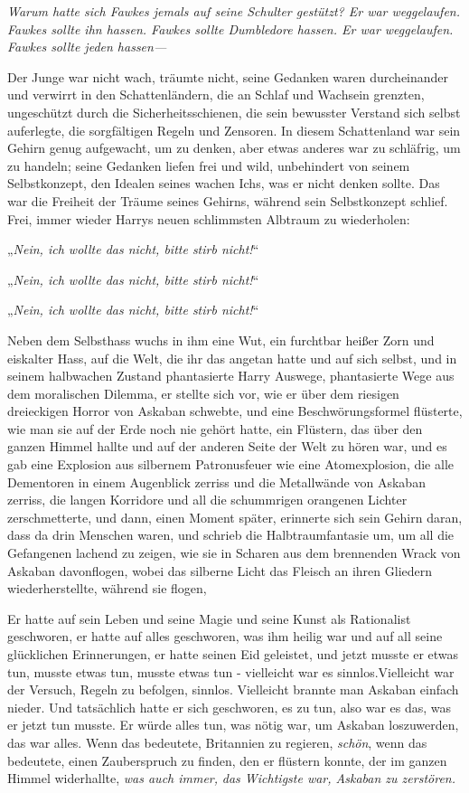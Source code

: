 {\emph{Warum hatte sich Fawkes jemals auf seine Schulter gestützt? Er war weggelaufen. Fawkes sollte ihn hassen. Fawkes sollte Dumbledore hassen. Er war weggelaufen. Fawkes sollte jeden hassen—}

Der Junge war nicht wach, träumte nicht, seine Gedanken waren durcheinander und verwirrt in den Schattenländern, die an Schlaf und Wachsein grenzten, ungeschützt durch die Sicherheitsschienen, die sein bewusster Verstand sich selbst auferlegte, die sorgfältigen Regeln und Zensoren. In diesem Schattenland war sein Gehirn genug aufgewacht, um zu denken, aber etwas anderes war zu schläfrig, um zu handeln; seine Gedanken liefen frei und wild, unbehindert von seinem Selbstkonzept, den Idealen seines wachen Ichs, was er nicht denken sollte. Das war die Freiheit der Träume seines Gehirns, während sein Selbstkonzept schlief. Frei, immer wieder Harrys neuen schlimmsten Albtraum zu wiederholen:

„\emph{Nein, ich wollte das nicht, bitte stirb nicht!}“

„\emph{Nein, ich wollte das nicht, bitte stirb nicht!}“

„\emph{Nein, ich wollte das nicht, bitte stirb nicht!}“

Neben dem Selbsthass wuchs in ihm eine Wut, ein furchtbar heißer Zorn und eiskalter Hass, auf die Welt, die ihr das angetan hatte und auf sich selbst, und in seinem halbwachen Zustand phantasierte Harry Auswege, phantasierte Wege aus dem moralischen Dilemma, er stellte sich vor, wie er über dem riesigen dreieckigen Horror von Askaban schwebte, und eine Beschwörungsformel flüsterte, wie man sie auf der Erde noch nie gehört hatte, ein Flüstern, das über den ganzen Himmel hallte und auf der anderen Seite der Welt zu hören war, und es gab eine Explosion aus silbernem Patronusfeuer wie eine Atomexplosion, die alle Dementoren in einem Augenblick zerriss und die Metallwände von Askaban zerriss, die langen Korridore und all die schummrigen orangenen Lichter zerschmetterte, und dann, einen Moment später, erinnerte sich sein Gehirn daran, dass da drin Menschen waren, und schrieb die Halbtraumfantasie um, um all die Gefangenen lachend zu zeigen, wie sie in Scharen aus dem brennenden Wrack von Askaban davonflogen, wobei das silberne Licht das Fleisch an ihren Gliedern wiederherstellte, während sie flogen,

Er hatte auf sein Leben und seine Magie und seine Kunst als Rationalist geschworen, er hatte auf alles geschworen, was ihm heilig war und auf all seine glücklichen Erinnerungen, er hatte seinen Eid geleistet, und jetzt musste er etwas tun, musste etwas tun, musste etwas tun - vielleicht war es sinnlos.Vielleicht war der Versuch, Regeln zu befolgen, sinnlos. Vielleicht brannte man Askaban einfach nieder. Und tatsächlich hatte er sich geschworen, es zu tun, also war es das, was er jetzt tun musste. Er würde alles tun, was nötig war, um Askaban loszuwerden, das war alles. Wenn das bedeutete, Britannien zu regieren, \emph{schön}, wenn das bedeutete, einen Zauberspruch zu finden, den er flüstern konnte, der im ganzen Himmel widerhallte, \emph{was auch immer,} \emph{das Wichtigste war, Askaban zu zerstören.}

}
